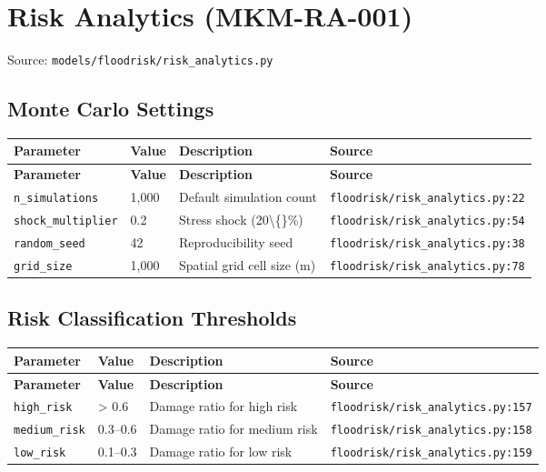 \documentclass[11pt,a4paper]{article}
\begin{document}
\clearpage

\section{Risk Analytics (MKM-RA-001)}

Source: \texttt{models/floodrisk/risk\_analytics.py}

\subsection{Monte Carlo Settings}

\begin{longtable}{p{4cm}p{4cm}p{5.5cm}p{3.5cm}}
    \toprule
    \textbf{Parameter} & \textbf{Value} & \textbf{Description} & \textbf{Source} \\
    \midrule
    \endfirsthead
    \toprule
    \textbf{Parameter} & \textbf{Value} & \textbf{Description} & \textbf{Source} \\
    \midrule
    \endhead
    \bottomrule
    \endfoot
    \texttt{n\_simulations} & 1,000 & Default simulation count & {\scriptsize \texttt{floodrisk/risk\_analytics.py:22}} \\
    \texttt{shock\_multiplier} & 0.2 & Stress shock (20\textbackslash\{\}\%) & {\scriptsize \texttt{floodrisk/risk\_analytics.py:54}} \\
    \texttt{random\_seed} & 42 & Reproducibility seed & {\scriptsize \texttt{floodrisk/risk\_analytics.py:38}} \\
    \texttt{grid\_size} & 1,000 & Spatial grid cell size (m) & {\scriptsize \texttt{floodrisk/risk\_analytics.py:78}} \\
\end{longtable}

\subsection{Risk Classification Thresholds}

\begin{longtable}{p{4cm}p{4cm}p{5.5cm}p{3.5cm}}
    \toprule
    \textbf{Parameter} & \textbf{Value} & \textbf{Description} & \textbf{Source} \\
    \midrule
    \endfirsthead
    \toprule
    \textbf{Parameter} & \textbf{Value} & \textbf{Description} & \textbf{Source} \\
    \midrule
    \endhead
    \bottomrule
    \endfoot
    \texttt{high\_risk} & > 0.6 & Damage ratio for high risk & {\scriptsize \texttt{floodrisk/risk\_analytics.py:157}} \\
    \texttt{medium\_risk} & 0.3--0.6 & Damage ratio for medium risk & {\scriptsize \texttt{floodrisk/risk\_analytics.py:158}} \\
    \texttt{low\_risk} & 0.1--0.3 & Damage ratio for low risk & {\scriptsize \texttt{floodrisk/risk\_analytics.py:159}} \\
\end{longtable}
\end{document}
